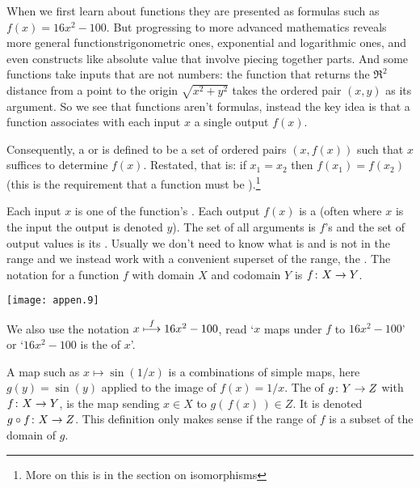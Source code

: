 When we first learn about functions they are
presented as formulas such as \( f(x)=16x^2-100 \).
But progressing to more advanced mathematics reveals more general
functions\Dash trigonometric ones, exponential and
logarithmic ones, and even constructs like absolute value that involve
piecing together parts. 
And some functions take inputs that are not numbers:
the function that returns the $\Re^2$ distance from a point to the origin 
\( \sqrt{x^2+y^2} \)
takes the ordered pair \( (x,y) \) as its argument.
So we see that functions aren't
formulas, instead the key idea is that a function associates with each
input \( x \) a single output \( f(x) \).

Consequently, a  
or  is defined
to be a set of ordered pairs \( (x,f(x)) \)
such that \( x \) suffices to determine \( f(x) \).
Restated, that is:
if \( x_1=x_2 \) then \( f(x_1)=f(x_2) \)
(this is the requirement that a
function must be %
).\footnote{More on this is in the section
on isomorphisms}

Each input \( x \) is one of the function's 
. 
Each output \( f(x) \) is a 
(often where $x$ is the input the output is denoted $y$).
The set of all arguments is \( f \)'s 
and the set of output values is its 
.
Usually we don't need to know what is and is not in the range and we instead
work with a convenient superset of the range, the
.
The notation for a function \( f \) with domain \( X \) and codomain \( Y \) is
\( \mbox{$f\colon X\to Y$} \).
\begin{center}
  \texttt{[image: appen.9]}
\end{center}
We also use the notation \( x\stackrel{f}{\longmapsto} 16x^2-100 \), read
`\( x \) maps under \( f \) to \( 16x^2-100 \)' or
`\( 16x^2-100 \) is the  
of \( x \)'.

A map such as \( x\mapsto \sin(1/x) \) is a
combinations of simple maps, here
\( g(y)=\sin(y) \) applied to the image of \( f(x)=1/x \).
The  
of \( \mbox{$g\colon Y\to Z$} \) with \( \mbox{$f\colon X\to Y$} \),
is the map sending
\( x\in X \) to \( g(\, f(x)\,)\in Z \).
It is denoted \( \mbox{$g\mathbin{\circ} f\colon X\to Z$} \).
This definition only makes sense if the range of \( f \) is a
subset of the domain of \( g \).

